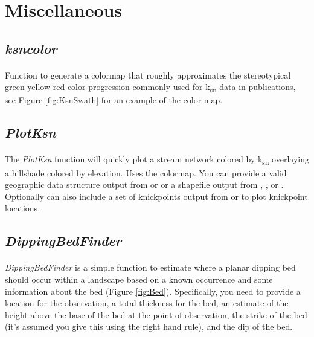 \section{Miscellaneous}

\subsection{\textit{ksncolor}} \label{sec:ksncolor}
\paragraph{}Function to generate a colormap that roughly approximates the stereotypical green-yellow-red color progression commonly used for k\textsubscript{sn} data in publications, see Figure \ref{fig:KsnSwath} for an example of the color map. 

\subsection{\textit{PlotKsn}} \label{sec:plotksn}
\paragraph{}The \textit{PlotKsn} function will quickly plot a stream network colored by k\textsubscript{sn} overlaying a hillshade colored by elevation. Uses the  colormap. You can provide a valid geographic data structure output from  or   or a shapefile output from , , or  . Optionally can also include a set of knickpoints output from  or  to plot knickpoint locations. 

\subsection{\textit{DippingBedFinder}} \label{sec:BedFinder}
\paragraph{}\textit{DippingBedFinder} is a simple function to estimate where a planar dipping bed should occur within a landscape based on a known occurrence and some information about the bed (Figure \ref{fig:Bed}). Specifically, you need to provide a location for the observation, a total thickness for the bed, an estimate of the height above the base of the bed at the point of observation, the strike of the bed (it's assumed you give this using the right hand rule), and the dip of the bed. 

